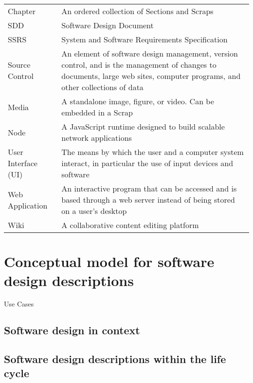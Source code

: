 \documentclass[letterpaper, 10pt, draftclsnofoot, compsoc, onecolumn]{IEEEtran}
\begin{document}
\begin{center}
\begin{supertabular}{p{3cm}p{12cm}}
Chapter & An ordered collection of Sections and Scraps\\ 

SDD & Software Design Document \\ 

SSRS & System and Software Requirements Specification \\ 

Source Control & An element of software design management, version control, and is the 
management of changes to documents, large web sites, computer programs, and other 
collections of data \\ 

Media & A standalone image, figure, or video. Can be embedded in a Scrap\\

Node & A JavaScript runtime designed to build scalable network applications\\ 

User Interface (UI)  & The means by which the user and a computer system interact, 
	in particular the use of input devices and software\\

Web Application & An interactive program that can be accessed and is based through a web server instead of 
being stored on a user's desktop\\

Wiki & A collaborative content editing platform \\ 
\end{supertabular}

\end{center}



\section{Conceptual model for software design descriptions}
{\noindent Use Cases \par}


\subsection{Software design in context}
{\noindent \par}

\subsection{Software design descriptions within the life cycle}
{\noindent \par}
\end{document}
